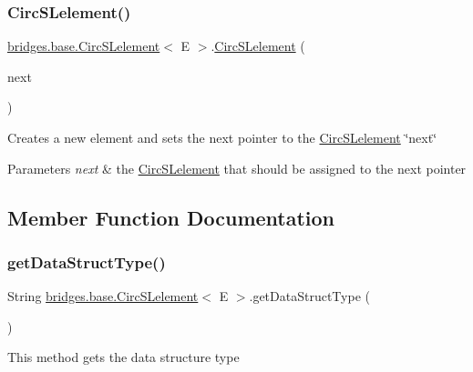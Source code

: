 \subsubsection{\texorpdfstring{CircSLelement()}{CircSLelement()}\hspace{0.1cm}{\footnotesize\ttfamily [4/4]}}
{\footnotesize\ttfamily \mbox{\hyperlink{classbridges_1_1base_1_1_circ_s_lelement}{bridges.\+base.\+Circ\+S\+Lelement}}$<$ E $>$.\mbox{\hyperlink{classbridges_1_1base_1_1_circ_s_lelement}{Circ\+S\+Lelement}} (\begin{DoxyParamCaption}\item[{\mbox{\hyperlink{classbridges_1_1base_1_1_circ_s_lelement}{Circ\+S\+Lelement}}$<$ E $>$}]{next }\end{DoxyParamCaption})}

Creates a new element and sets the next pointer to the \mbox{\hyperlink{classbridges_1_1base_1_1_circ_s_lelement}{Circ\+S\+Lelement}} \char`\"{}next\char`\"{}


\begin{DoxyParams}{Parameters}
{\em next} & the \mbox{\hyperlink{classbridges_1_1base_1_1_circ_s_lelement}{Circ\+S\+Lelement}} that should be assigned to the next pointer \\
\hline
\end{DoxyParams}


\subsection{Member Function Documentation}
\mbox{\label{classbridges_1_1base_1_1_circ_s_lelement_ad56acddc52e8e0b6869a6f24f1e0a90e}} 
\subsubsection{\texorpdfstring{getDataStructType()}{getDataStructType()}}
{\footnotesize\ttfamily String \mbox{\hyperlink{classbridges_1_1base_1_1_circ_s_lelement}{bridges.\+base.\+Circ\+S\+Lelement}}$<$ E $>$.get\+Data\+Struct\+Type (\begin{DoxyParamCaption}{ }\end{DoxyParamCaption})}

This method gets the data structure type

